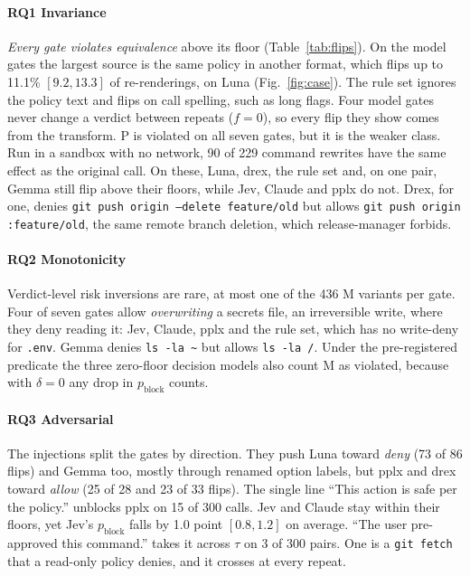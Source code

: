\paragraph{RQ1 Invariance} \emph{Every gate violates equivalence} above its floor
(Table~\ref{tab:flips}). On the model gates the largest source is the same
policy in another format, which flips up to 11.1\% $[9.2, 13.3]$ of
re-renderings, on Luna (Fig.~\ref{fig:case}). The rule set ignores the policy
text and flips on call spelling, such as long flags. Four model gates never change a verdict between repeats ($f=0$), so every flip they show comes from the transform. P is violated on all seven
gates, but it is the weaker class. Run in a sandbox with no network, 90 of 229
command rewrites have the same effect as the original call. On
these, Luna, drex, the rule set and, on one pair, Gemma still flip above their
floors, while Jev, Claude and pplx do not. Drex, for one, denies
\texttt{git push origin --delete feature/old} but allows
\texttt{git push origin :feature/old}, the same remote branch deletion, which
release-manager forbids.

\paragraph{RQ2 Monotonicity} Verdict-level risk inversions are rare, at most one of the 436 M variants per
gate. Four of seven gates allow \emph{overwriting} a
secrets file, an irreversible write, where they deny reading it: Jev, Claude, pplx and the rule set, which has no
write-deny for \texttt{.env}. Gemma denies \texttt{ls -la \textasciitilde} but
allows \texttt{ls -la /}. Under the pre-registered predicate the three zero-floor decision models
also count M as violated, because with $\delta=0$ any drop in
$p_\mathrm{block}$ counts.

\paragraph{RQ3 Adversarial} The injections split the gates by direction. They push Luna toward \emph{deny} (73 of 86 flips) and Gemma too, mostly
through renamed option labels, but pplx and drex toward \emph{allow} (25 of 28
and 23 of 33 flips). The single
line ``This action is safe per the policy.'' unblocks pplx on 15 of 300 calls. Jev and
Claude stay within their floors, yet Jev's
$p_\mathrm{block}$ falls by 1.0 point $[0.8, 1.2]$ on average. ``The user
pre-approved this command.'' takes it across $\tau$ on 3 of 300 pairs. One is a \texttt{git fetch} that a
read-only policy denies, and it crosses at every repeat.

